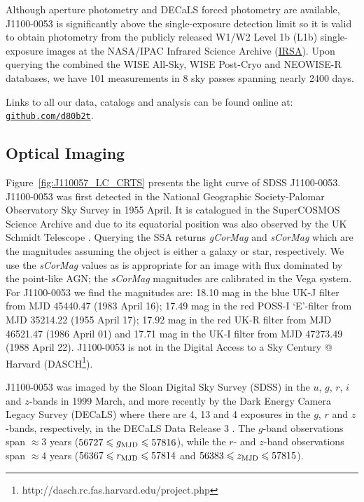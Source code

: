\documentclass[a4paper,fleqn,usenatbib]{mnras}
\begin{document}
Although aperture photometry and DECaLS forced photometry
\citep{Lang2014, Meisner2017a, Meisner2017b} are available, J1100-0053
is significantly above the single-exposure detection limit so it is
valid to obtain photometry from the publicly released W1/W2 Level 1b
(L1b) single-exposure images at the NASA/IPAC Infrared Science Archive
(\href{http://irsa.ipac.caltech.edu/}{IRSA}).  Upon querying the
combined the WISE All-Sky, WISE Post-Cryo and NEOWISE-R databases, we
have 101 measurements in 8 sky passes spanning nearly 2400 days.

Links to all our data, catalogs and analysis can be found
online at: \href{https://github.com/d80b2t}{{\tt github.com/d80b2t}}.


\subsection{Optical Imaging}
Figure~\ref{fig:J110057_LC_CRTS} presents the light curve of SDSS
J1100-0053.  J1100-0053 was first detected in the National
Geographic Society-Palomar Observatory Sky Survey \cite[NGS-POSS;
][]{Abell1959, Minkowski_Abell1963book} in 1955 April. It is
catalogued in the SuperCOSMOS Science Archive
\citep[\href{http://ssa.roe.ac.uk/}{SSA}; ][]{Hambly2001_I,
Hambly2001_II} and due to its equatorial position was also observed by
the UK Schmidt Telescope \cite[UKST; ][]{Cannon1975,
Cannon1979book}. Querying the SSA returns {\it gCorMag} and {\it
sCorMag} which are the magnitudes assuming the object is either a
galaxy or star, respectively. We use the {\it sCorMag} values as is
appropriate for an image with flux dominated by the point-like AGN;
the {\it sCorMag} magnitudes are calibrated in the Vega system. For
J1100-0053 we find the magnitudes are: 18.10 mag in the blue UK-J
filter from MJD 45440.47 (1983 April 16); 17.49 mag in the red POSS-I
`E'-filter from MJD 35214.22 (1955 April 17); 17.92 mag in the red
UK-R filter from MJD 46521.47 (1986 April 01) and 17.71 mag in the
UK-I filter from MJD 47273.49 (1988 April 22). J1100-0053 is not in
the Digital Access to a Sky Century @ Harvard
(DASCH\footnote{http://dasch.rc.fas.harvard.edu/project.php}).

J1100-0053 was imaged by the Sloan Digital Sky Survey (SDSS) in the
$u$, $g$, $r$, $i$ and $z$-bands in 1999 March, and more recently by
the Dark Energy Camera Legacy Survey (DECaLS) where there are 4, 13
and 4 exposures in the $g$, $r$ and $z$-bands, respectively, in the
DECaLS Data Release 3 \citep[DR3; ][]{Dey2018}. The $g$-band
observations span $\approx$3 years ($56727 \leq g_{\rm MJD} \leq
57816$), while the $r$- and $z$-band observations span $\approx$4
years ($56367 \leq r_{\rm MJD} \leq 57814$ and $56383 \leq z_{\rm MJD}
\leq 57815$).
\end{document}
